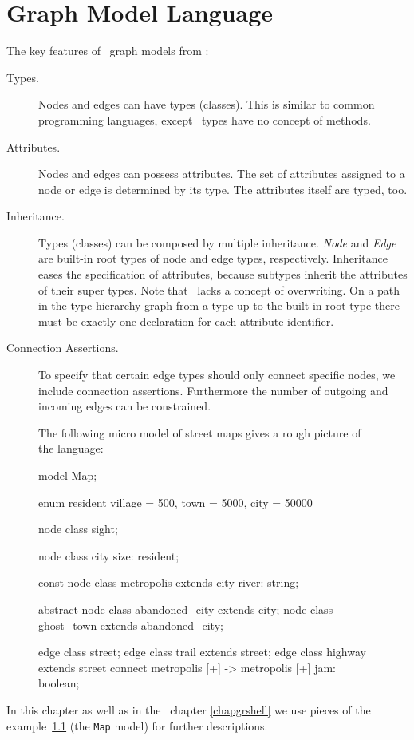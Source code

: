 \chapter{Graph Model Language}
\label{chapmodellang}
The key features of \GrG\ graph models from \cite{geiss}:

\begin{description}
\item[Types.] Nodes and edges can have types (classes). This is similar to common programming languages, except \GrG\ types have no concept of methods. 
\item[Attributes.] Nodes and edges can possess attributes. The set of attributes assigned to a node or edge is determined by its type. The attributes itself are typed, too.
\item[Inheritance.] Types (classes) can be composed by multiple inheritance. \emph{Node} and \emph{Edge} are built-in root types of node and edge types, respectively. Inheritance eases the specification of attributes, because subtypes inherit the attributes of their super types. Note that \GrG\ lacks a concept of overwriting. On a path in the type hierarchy graph from a type up to the built-in root type there must be exactly one declaration for each attribute identifier.
\item[Connection Assertions.] To specify that certain edge types should only connect specific nodes, we include connection assertions. Furthermore the number of outgoing and incoming edges can be constrained.
\end{description}

\begin{figure}[htbf]
\begin{example}\label{ex:model:map}
The following micro model of street maps gives a rough picture of the language:
\begin{grgen}
model Map;

enum resident {village = 500, town = 5000, city = 50000}

node class sight;

node class city {
	size: resident;
}

const node class metropolis extends city {
  river: string;
}  

abstract node class abandoned_city extends city;
node class ghost_town extends abandoned_city;

edge class street;
edge class trail extends street;
edge class highway extends street
    connect metropolis [+] -> metropolis [+]
{
    jam: boolean;
}
\end{grgen}
\end{example}
\end{figure}
In this chapter as well as in the \GrShell\ chapter \ref{chapgrshell} we use pieces of the example~\ref{ex:model:map} (the \texttt{Map} model) for further descriptions.

